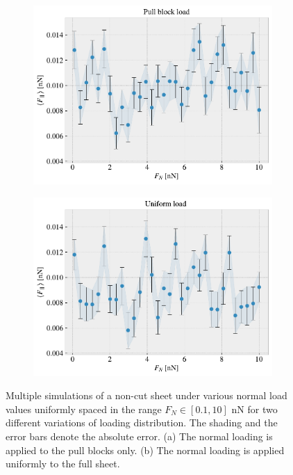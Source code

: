 \begin{figure}[!htb]
  \centering
  \begin{subfigure}[t]{0.49\textwidth}
      \centering
      \includegraphics[width=\textwidth]{figures/baseline/load_dist_a.pdf}
      \caption{}
      \label{fig:load_dist_a}
  \end{subfigure}
  \hfill
  \begin{subfigure}[t]{0.49\textwidth}
      \centering
      \includegraphics[width=\textwidth]{figures/baseline/load_dist_b.pdf}
      \caption{}
      \label{fig:load_dist_b}
  \end{subfigure}
  \hfill
     \caption{Multiple simulations of a non-cut sheet under various normal load values uniformly spaced in the range $F_N \in [0.1, 10]$ nN for two different variations of loading distribution. The shading and the error bars denote the absolute error. (a) The normal loading is applied to the pull blocks only. (b) The normal loading is applied uniformly to the full sheet. }
     \label{fig:load_dist}
\end{figure}

